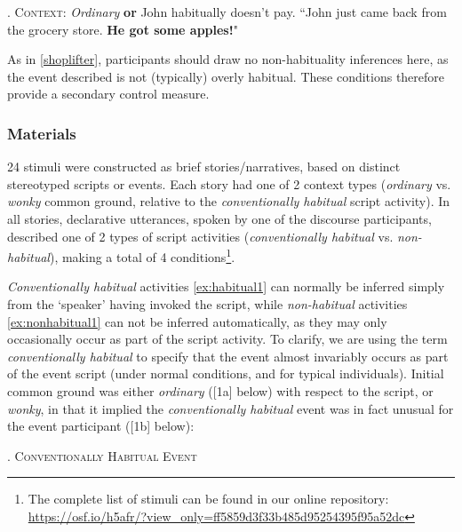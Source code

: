 \documentclass{sp}\usepackage[]{graphicx}\usepackage[]{color}
\begin{document}
\ex.\label{apples} \textsc{Context}: \textit{Ordinary} \textbf{or} John habitually doesn't pay.  
``John just came back from the grocery store.  \textbf{He got some apples!}"

As in \ref{shoplifter}, participants should draw no non-habituality inferences here, as the event described is not (typically) overly habitual. These conditions therefore provide a secondary control measure.

\subsubsection{Materials}

24 stimuli were constructed as brief stories/narratives, based on distinct stereotyped scripts or events. Each story had one of 2 context types (\textit{ordinary} vs. \textit{wonky} common ground, relative to the \textit{conventionally habitual} script activity). In all stories, declarative utterances, spoken by one of the discourse participants, described one of 2 types of script activities (\textit{conventionally habitual} vs. \textit{non-habitual}), making a total of 4 conditions\footnote{The complete list of stimuli can be found in our online repository: \url{https://osf.io/h5afr/?view_only=ff5859d3f33b485d95254395f95a52dc}}.

\textit{Conventionally habitual} activities \ref{ex:habitual1} can normally be inferred simply from the `speaker' having invoked the script, while \textit{non-habitual} activities \ref{ex:nonhabitual1} can not be inferred automatically, as they may only occasionally occur as part of the script activity. To clarify, we are using the term \textit{conventionally habitual} to specify that the event almost invariably occurs as part of the event script (under normal conditions, and for typical individuals). Initial common ground was either \textit{ordinary} ([1a] below) with respect to the script, or \textit{wonky}, in that it implied the \textit{conventionally habitual} event was in fact unusual for the event participant ([1b] below): 

\ex.\label{ex:habitual1} \centering\textsc{Conventionally Habitual Event}
\vspace{-0.1cm}
\centering
\end{document}
